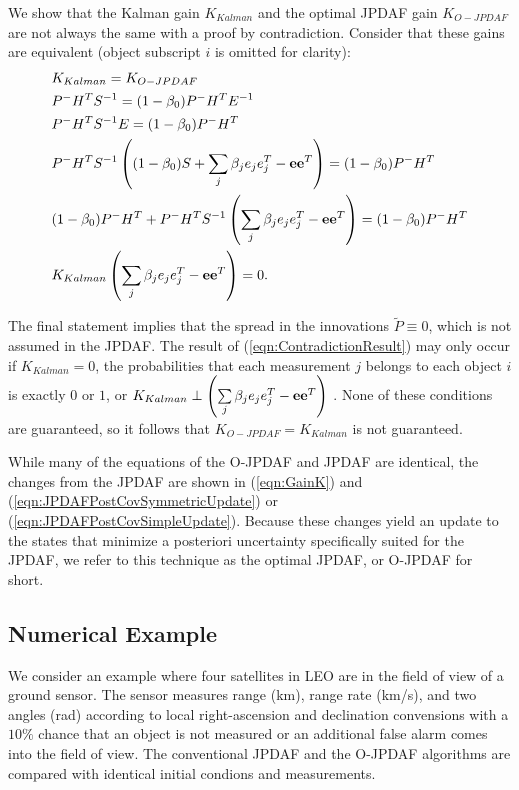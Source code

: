 \documentclass[10pt]{article}
\newcommand{\refeqn}[1]{(\ref{eqn:#1})}
\theoremstyle{plain}\theorembodyfont{\normalfont}
\begin{document}
We show that the Kalman gain $K_{Kalman}$ and the optimal JPDAF gain $K_{O-JPDAF}$ are not always the same with a proof by contradiction. Consider that these gains are equivalent (object subscript $i$ is omitted for clarity):
\begin{align}
&K_{Kalman}=K_{O-JPDAF}
\\
&P^-H^TS^{-1}=(1-\beta_{0})P^-H^TE^{-1}
\\
&P^-H^TS^{-1}E=(1-\beta_{0})P^-H^T
\\
&P^-H^TS^{-1}\left((1-\beta_{0})S+{\sum\limits_{j} \beta_{j}e_{j}e_{j}^T-{\bf{e}}}{\bf{e}}^T\right)=(1-\beta_{0})P^-H^T
\\
&(1-\beta_{0})P^-H^T+P^-H^TS^{-1}\left({\sum\limits_{j} \beta_{j}e_{j}e_{j}^T-{\bf{e}}}{\bf{e}}^T\right)=(1-\beta_{0})P^-H^T
\\
&K_{Kalman}\left({\sum\limits_{j} \beta_{j}e_{j}e_{j}^T-{\bf{e}}}{\bf{e}}^T\right)=0.\label{eqn:ContradictionResult}
\end{align}

The final statement implies that the spread in the innovations $\tilde P\equiv0$, which is not assumed in the JPDAF. The result of \refeqn{ContradictionResult} may only occur if $K_{Kalman}=0$, the probabilities that each measurement $j$ belongs to each object $i$ is exactly $0$ or $1$, or $K_{Kalman}\perp\left({\sum\limits_{j} \beta_{j}e_{j}e_{j}^T-{\bf{e}}}{\bf{e}}^T\right)$ . None of these conditions are guaranteed, so it follows that $K_{O-JPDAF}=K_{Kalman}$ is not guaranteed.

While many of the equations of the O-JPDAF and JPDAF are identical, the changes from the JPDAF are shown in \refeqn{GainK} and \refeqn{JPDAFPostCovSymmetricUpdate} or \refeqn{JPDAFPostCovSimpleUpdate}. Because these changes yield an update to the states that minimize a posteriori uncertainty specifically suited for the JPDAF, we refer to this technique as the optimal JPDAF, or O-JPDAF for short.

\subsection{Numerical Example}
We consider an example where four satellites in LEO are in the field of view of a ground sensor. The sensor measures range (km), range rate (km/s), and two angles (rad) according to local right-ascension and declination convensions with a $10\%$ chance that an object is not measured or an additional false alarm comes into the field of view. The conventional JPDAF and the O-JPDAF algorithms are compared with identical initial condions and measurements.
\end{document}
